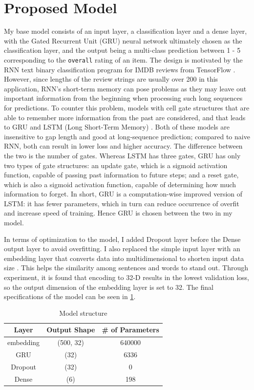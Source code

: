 \documentclass[12pt]{article}
\begin{document}
\section{Proposed Model}
\vspace{-0.3cm}
My base model consists of an input layer, a classification layer and a dense layer, with the Gated Recurrent Unit (GRU) neural network ultimately chosen as the classification layer, and the output being a multi-class prediction between 1 - 5 corresponding to the \texttt{overall} rating of an item. The design is motivated by the RNN text binary classification program for IMDB reviews from TensorFlow \cite{Textclassification}. However, since lengths of the review strings are usually over 200 in this application, RNN’s short-term memory can pose problems as they may leave out important information from the beginning when processing such long sequences for predictions. To counter this problem, models with cell gate structures that are able to remember more information from the past are considered, and that leads to GRU and LSTM (Long Short-Term Memory) \cite{gru}. Both of these models are insensitive to gap length and good at long-sequence prediction; compared to naive RNN, both can result in lower loss and higher accuracy. The difference between the two is the number of gates. Whereas LSTM has three gates, GRU has only two types of gate structures: an update gate, which is a sigmoid activation function, capable of passing past information to future steps; and a reset gate, which is also a sigmoid activation function, capable of determining how much information to forget. In short, GRU is a computation-wise improved version of LSTM: it has fewer parameters, which in turn can reduce occurrence of overfit and increase speed of training. Hence GRU is chosen between the two in my model.

In terms of optimization to the model, I added Dropout layer before the Dense output layer to avoid overfitting. I also replaced the simple input layer with an embedding layer that converts data into multidimensional to shorten input data size \cite{emd}. This helps the similarity among sentences and words to stand out. Through experiment, it is found that encoding to 32-D results in the lowest validation loss, so the output dimension of the embedding layer is set to 32. The final specifications of the model can be seen in \ref{table:ms}.
\begin{table}[h!]
    \small
    \centering
        \begin{tabular}{|c|c|c|}
        \hline
        Layer & Output Shape & \# of Parameters \\
        \hline 
        embedding & (500, 32) & 640000 \\
        \hline
        GRU &                   (32) &               6336 \\
        \hline
        Dropout &                   (32) &               0 \\
        \hline
        Dense  &               (6)     &            198  \\
        \hline
        \end{tabular}
    \caption{Model structure}
    \label{table:ms}
    \vspace{-0.7cm}
\end{table}
\end{document}
